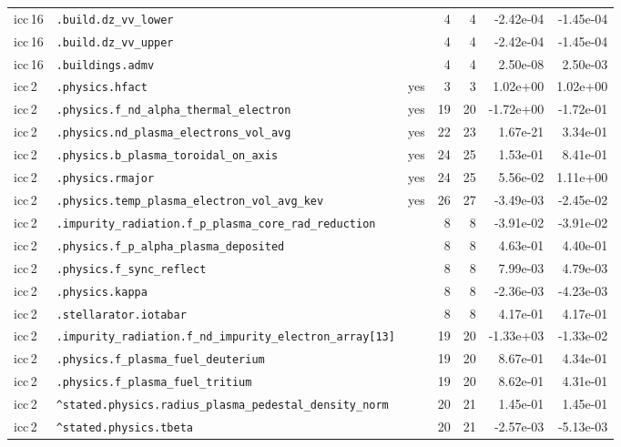 \begin{tabular}{llcrrrr}
icc\,16 & \texttt{.build.dz\_vv\_lower} &  & 4 & 4 & -2.42e-04 & -1.45e-04 \\
icc\,16 & \texttt{.build.dz\_vv\_upper} &  & 4 & 4 & -2.42e-04 & -1.45e-04 \\
icc\,16 & \texttt{.buildings.admv} &  & 4 & 4 & 2.50e-08 & 2.50e-03 \\
icc\,2 & \texttt{.physics.hfact} & yes & 3 & 3 & 1.02e+00 & 1.02e+00 \\
icc\,2 & \texttt{.physics.f\_nd\_alpha\_thermal\_electron} & yes & 19 & 20 & -1.72e+00 & -1.72e-01 \\
icc\,2 & \texttt{.physics.nd\_plasma\_electrons\_vol\_avg} & yes & 22 & 23 & 1.67e-21 & 3.34e-01 \\
icc\,2 & \texttt{.physics.b\_plasma\_toroidal\_on\_axis} & yes & 24 & 25 & 1.53e-01 & 8.41e-01 \\
icc\,2 & \texttt{.physics.rmajor} & yes & 24 & 25 & 5.56e-02 & 1.11e+00 \\
icc\,2 & \texttt{.physics.temp\_plasma\_electron\_vol\_avg\_kev} & yes & 26 & 27 & -3.49e-03 & -2.45e-02 \\
icc\,2 & \texttt{.impurity\_radiation.f\_p\_plasma\_core\_rad\_reduction} &  & 8 & 8 & -3.91e-02 & -3.91e-02 \\
icc\,2 & \texttt{.physics.f\_p\_alpha\_plasma\_deposited} &  & 8 & 8 & 4.63e-01 & 4.40e-01 \\
icc\,2 & \texttt{.physics.f\_sync\_reflect} &  & 8 & 8 & 7.99e-03 & 4.79e-03 \\
icc\,2 & \texttt{.physics.kappa} &  & 8 & 8 & -2.36e-03 & -4.23e-03 \\
icc\,2 & \texttt{.stellarator.iotabar} &  & 8 & 8 & 4.17e-01 & 4.17e-01 \\
icc\,2 & \texttt{.impurity\_radiation.f\_nd\_impurity\_electron\_array[13]} &  & 19 & 20 & -1.33e+03 & -1.33e-02 \\
icc\,2 & \texttt{.physics.f\_plasma\_fuel\_deuterium} &  & 19 & 20 & 8.67e-01 & 4.34e-01 \\
icc\,2 & \texttt{.physics.f\_plasma\_fuel\_tritium} &  & 19 & 20 & 8.62e-01 & 4.31e-01 \\
icc\,2 & \texttt{^stated.physics.radius\_plasma\_pedestal\_density\_norm} &  & 20 & 21 & 1.45e-01 & 1.45e-01 \\
icc\,2 & \texttt{^stated.physics.tbeta} &  & 20 & 21 & -2.57e-03 & -5.13e-03 \\
\bottomrule
\end{tabular}
